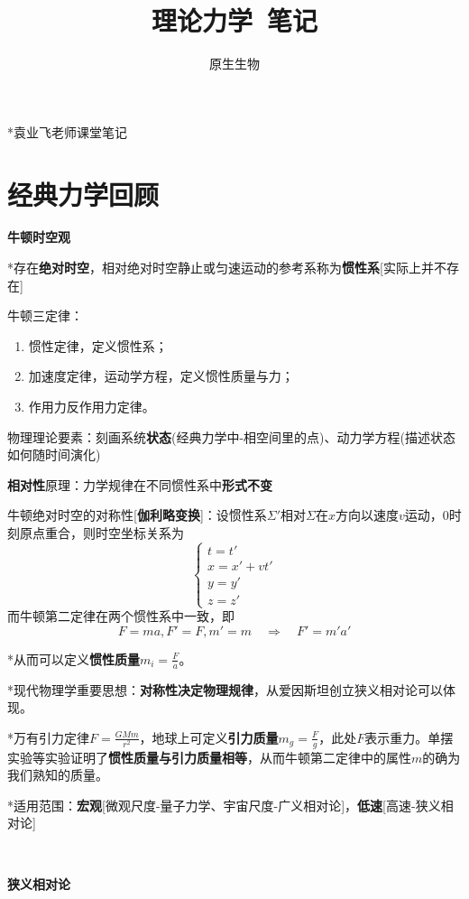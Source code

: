 \documentclass[a4paper,UTF8,fontset=windows]{ctexart}
\title{\textbf{理论力学\ 笔记}}
\author{原生生物}
\date{}
\begin{document}
\maketitle

*袁业飞老师课堂笔记

\tableofcontents

\newpage

\section{经典力学回顾}
\textbf{牛顿时空观}

*存在\textbf{绝对时空}，相对绝对时空静止或匀速运动的参考系称为\textbf{惯性系}[实际上并不存在]

牛顿三定律：
\begin{enumerate}
    \item 惯性定律，定义惯性系；
    \item 加速度定律，运动学方程，定义惯性质量与力；
    \item 作用力反作用力定律。
\end{enumerate}

物理理论要素：刻画系统\textbf{状态}(经典力学中-相空间里的点)、动力学方程(描述状态如何随时间演化)

\textbf{相对性}原理：力学规律在不同惯性系中\textbf{形式不变}

牛顿绝对时空的对称性[\textbf{伽利略变换}]：设惯性系$\Sigma'$相对$\Sigma$在$x$方向以速度$v$运动，0时刻原点重合，则时空坐标关系为
$$\begin{cases}t=t'\\x=x'+vt'\\y=y'\\z=z'\end{cases}$$
而牛顿第二定律在两个惯性系中一致，即
$$F=ma,F'=F,m'=m\quad\Rightarrow\quad F'=m'a'$$

*从而可以定义\textbf{惯性质量}$m_i=\frac{F}{a}$。

*现代物理学重要思想：\textbf{对称性决定物理规律}，从爱因斯坦创立狭义相对论可以体现。

*万有引力定律$F=\frac{GMm}{r^2}$，地球上可定义\textbf{引力质量}$m_g=\frac{F}{g}$，此处$F$表示重力。单摆实验等实验证明了\textbf{惯性质量与引力质量相等}，从而牛顿第二定律中的属性$m$的确为我们熟知的质量。

*适用范围：\textbf{宏观}[微观尺度-量子力学、宇宙尺度-广义相对论]，\textbf{低速}[高速-狭义相对论]

\

\textbf{狭义相对论}
\end{document}
